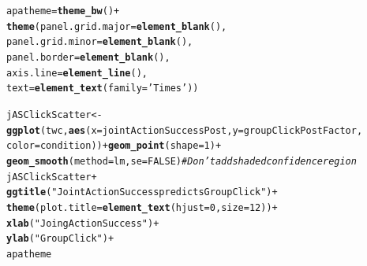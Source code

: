 \documentclass[english]{article}\usepackage[]{graphicx}\usepackage[]{color}
\makeatletter
\newcommand{\hlnum}[1]{\textcolor[rgb]{0.686,0.059,0.569}{#1}}%
\newcommand{\hlstr}[1]{\textcolor[rgb]{0.192,0.494,0.8}{#1}}%
\newcommand{\hlcom}[1]{\textcolor[rgb]{0.678,0.584,0.686}{\textit{#1}}}%
\newcommand{\hlopt}[1]{\textcolor[rgb]{0,0,0}{#1}}%
\newcommand{\hlstd}[1]{\textcolor[rgb]{0.345,0.345,0.345}{#1}}%
\newcommand{\hlkwb}[1]{\textcolor[rgb]{0.69,0.353,0.396}{#1}}%
\newcommand{\hlkwc}[1]{\textcolor[rgb]{0.333,0.667,0.333}{#1}}%
\newcommand{\hlkwd}[1]{\textcolor[rgb]{0.737,0.353,0.396}{\textbf{#1}}}%
\newenvironment{kframe}{%
 \def\at@end@of@kframe{}%
 \ifinner\ifhmode%
  \def\at@end@of@kframe{\end{minipage}}%
  \begin{minipage}{\columnwidth}%
 \fi\fi%
 \def\FrameCommand##1{\hskip\@totalleftmargin \hskip-\fboxsep
 \colorbox{shadecolor}{##1}\hskip-\fboxsep
     \hskip-\linewidth \hskip-\@totalleftmargin \hskip\columnwidth}%
 \MakeFramed {\advance\hsize-\width
   \@totalleftmargin\z@ \linewidth\hsize
   \@setminipage}}%
 {\par\unskip\endMakeFramed%
 \at@end@of@kframe}
\newenvironment{knitrout}{}{} %
\makeatother
\begin{document}
\begin{knitrout}
\color{fgcolor}\begin{kframe}
\begin{alltt}
\hlstd{apatheme}\hlkwb{=}\hlkwd{theme_bw}\hlstd{()}\hlopt{+}
  \hlkwd{theme}\hlstd{(}\hlkwc{panel.grid.major}\hlstd{=}\hlkwd{element_blank}\hlstd{(),}
        \hlkwc{panel.grid.minor}\hlstd{=}\hlkwd{element_blank}\hlstd{(),}
        \hlkwc{panel.border}\hlstd{=}\hlkwd{element_blank}\hlstd{(),}
        \hlkwc{axis.line}\hlstd{=}\hlkwd{element_line}\hlstd{(),}
        \hlkwc{text}\hlstd{=}\hlkwd{element_text}\hlstd{(}\hlkwc{family}\hlstd{=}\hlstr{'Times'}\hlstd{))}

\hlstd{jASClickScatter} \hlkwb{<-} \hlkwd{ggplot}\hlstd{(twc,} \hlkwd{aes}\hlstd{(}\hlkwc{x}\hlstd{=jointActionSuccessPost,} \hlkwc{y}\hlstd{=groupClickPostFactor,}
                            \hlkwc{color}\hlstd{=condition))} \hlopt{+} \hlkwd{geom_point}\hlstd{(}\hlkwc{shape} \hlstd{=} \hlnum{1}\hlstd{)} \hlopt{+}
                            \hlkwd{geom_smooth}\hlstd{(}\hlkwc{method}\hlstd{=lm,} \hlkwc{se}\hlstd{=}\hlnum{FALSE}\hlstd{)}   \hlcom{# Don't add shaded confidence region}
\hlstd{jASClickScatter} \hlopt{+}
            \hlkwd{ggtitle}\hlstd{(}\hlstr{"Joint Action Success predicts Group Click"}\hlstd{)} \hlopt{+}
            \hlkwd{theme}\hlstd{(}\hlkwc{plot.title} \hlstd{=} \hlkwd{element_text}\hlstd{(}\hlkwc{hjust}\hlstd{=}\hlnum{0}\hlstd{,} \hlkwc{size}\hlstd{=}\hlnum{12}\hlstd{))} \hlopt{+}
            \hlkwd{xlab}\hlstd{(}\hlstr{"Joing Action Success"}\hlstd{)} \hlopt{+}
            \hlkwd{ylab}\hlstd{(}\hlstr{"Group Click"}\hlstd{)} \hlopt{+}
            \hlstd{apatheme}
\end{alltt}


{\ttfamily\noindent\color{warningcolor}{\#\# Warning: Removed 1 rows containing non-finite values (stat\_smooth).}}

{\ttfamily\noindent\color{warningcolor}{\#\# Warning: Removed 1 rows containing missing values (geom\_point).}}\end{kframe}\begin{figure}


\end{figure}
\end{knitrout}
\end{document}
